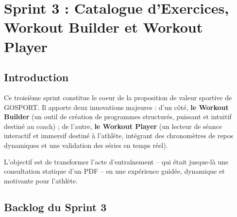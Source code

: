 \chapter{Sprint 3 : Catalogue d'Exercices, Workout Builder et Workout Player}
\minitoc
\newpage

\section{Introduction}
Ce troisième sprint constitue le coeur de la proposition de valeur sportive de GOSPORT. Il apporte deux innovations majeures : d'un côté, \textbf{le Workout Builder} (un outil de création de programmes structurés, puissant et intuitif destiné au coach) ; de l'autre, \textbf{le Workout Player} (un lecteur de séance interactif et immersif destiné à l'athlète, intégrant des chronomètres de repos dynamiques et une validation des séries en temps réel).

L'objectif est de transformer l'acte d'entraînement -- qui était jusque-là une consultation statique d'un PDF -- en une expérience guidée, dynamique et motivante pour l'athlète.

\section{Backlog du Sprint 3}

\begin{table}[H]
\centering
\renewcommand{\arraystretch}{1.4}
\caption{Backlog du Sprint 3 -- Workout Builder et Player}
\end{table}

